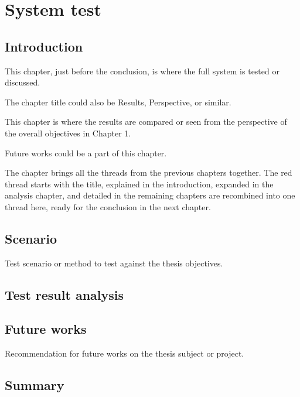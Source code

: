 \chapter{System test}
\section{Introduction}

{\color {dtured} This chapter, just before the conclusion, is where the full system is tested or discussed.

The chapter title could also be Results, Perspective, or similar.

This chapter is where the results are compared or seen from the perspective of the overall objectives in Chapter 1.

Future works could be a part of this chapter.

The chapter brings all the threads from the previous chapters together.
The red thread starts with the title, explained in the introduction, expanded in the analysis chapter, and detailed in the remaining chapters are recombined into one thread here, ready for the conclusion in the next chapter.
}

\section{Scenario}

{\color{dtured}Test scenario or method to test against the thesis objectives.
}


\section{Test result analysis}

\section{Future works}

{\color{dtured}
Recommendation for future works on the thesis subject or project.
}


\section{Summary}


